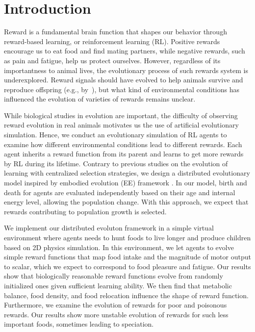 \section{Introduction}\label{sec:intro}
Reward is a fundamental brain function that shapes our behavior through reward-based learning, or reinforcement learning (RL). Positive rewards encourage us to eat food and find mating partners, while negative rewards, such as pain and fatigue, help us protect ourselves. However, regardless of its importantness to animal lives, the evolutionary process of such rewards system is underexplored. Reward signals should have evolved to help animals survive and reproduce offspring (e.g., by~\cite{schultzNeuronalRewardDecision2015}), but what kind of environmental conditions has influenced the evolution of varieties of rewards remains unclear.

While biological studies in evolution are important, the difficulty of observing reward evolution in real animals motivates us the use of artificial evolutionary simulation. Hence, we conduct an evolutionary simulation of RL agents to examine how different environmental conditions lead to different rewards. Each agent inherits a reward function from its parent and learns to get more rewards by RL during its lifetime. Contrary to previous studies on the evolution of learning \citep{hintonHowLearningCan1987,singhWhereRewardsCome2009} with centralized selection strategies, we design a distributed evolutionary model inspired by embodied evolution (EE) framework \citep{watsonEmbodiedEvolutionDistributing2002,bredecheEmbodiedEvolutionCollective2018}. In our model, birth and death for agents are evaluated independently based on their age and internal energy level, allowing the population change. With this approach, we expect that rewards contributing to population growth is selected.

We implement our distributed evoluton framework in a simple virtual environment where agents needs to hunt foods to live longer and produce children based on 2D physics simulation. In this environment, we let agents to evolve simple reward functions that map food intake and the magnitude of motor output to scalar, which we expect to correspond to food pleasure and fatigue. Our results show that biologically reasonable reward functions evolve from randomly initialized ones given sufficient learning ability. We then find that metabolic balance, food density, and food relocation influence the shape of reward function. Furthermore, we examine the evolution of rewards for poor and poisonous rewards. Our results show more unstable evolution of rewards for such less important foods, sometimes leading to speciation.

